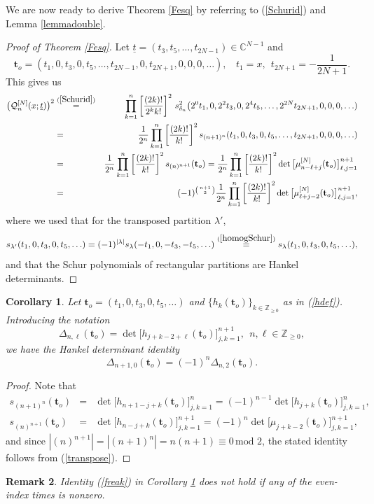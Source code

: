 \documentclass[10pt,reqno,oneside]{amsart}
\numberwithin{equation}{section}
\newtheorem{theo}{Theorem}[section]
\newtheorem{remark}[theo]{Remark}
\newtheorem{corollary}[theo]{Corollary}
\def\le{\left}
\def\ri{\right}
\def\un{\underline}
\def\bt{\begin{theo}}
\def\bc{\begin{corollary}}
\def\ec{\end{corollary}}
\def\br{\begin{remark}}
\def\er{\end{remark}}
\def\mod{\, \mathrm{mod}\,\,}
\def\eqref#1{(\ref{#1})}
\def\bt{{\mathbf t}}
\def\binom#1#2{\le({#1 \atop #2}\ri)}
\begin{document}
%
%
%
We are now ready to derive Theorem \ref{Fesq} by referring to \eqref{Schurid} and Lemma \ref{lemmadouble}.
\begin{proof}[Proof of Theorem \ref{Fesq}] Let $\un t=(t_3,t_5,\ldots,t_{2N-1})\in\mathbb{C}^{N-1}$ and
\begin{equation*}
	\bt_o=(t_1,0,t_3,0,t_5,\ldots,t_{2N-1},0,t_{2N+1},0,0,0,\ldots),\ \ \ \ t_1=x,\ \ t_{2N+1}=-\frac{1}{2N+1}.
\end{equation*}
This gives us
\begin{eqnarray*}
	\big(\mathcal{Q}_n^{[N]}(x;\un t)\big)^2&\stackrel{\eqref{Schurid}}{=}&\prod_{k=1}^n\left[\frac{(2k)!}{2^kk!}\right]^2\,s_{\delta_n}^2\big(2^0t_1,0,2^2t_3,0,2^4t_5,\ldots,2^{2N}t_{2N+1},0,0,0,\ldots)\\
	&=&\frac{1}{2^n}\prod_{k=1}^n\left[\frac{(2k)!}{k!}\right]^2s_{(n+1)^n}(t_1,0,t_3,0,t_5,\ldots,t_{2N+1},0,0,0,\ldots)\\
	&=&\frac{1}{2^n}\prod_{k=1}^n\left[\frac{(2k)!}{k!}\right]^2s_{(n)^{n+1}}(\bt_o)=\frac{1}{2^n}\prod_{k=1}^n\left[\frac{(2k)!}{k!}\right]^2\det\big[\mu_{n-\ell+j}^{[N]}(\bt_o)\big]_{\ell,j=1}^{n+1}\\
	&=&(-1)^{\binom{n+1}{2}}\frac{1}{2^n}\prod_{k=1}^n\left[\frac{(2k)!}{k!}\right]^2\det\big[\mu_{\ell+j-2}^{[N]}(\bt_o)\big]_{\ell,j=1}^{n+1},
\end{eqnarray*}
where we used that for the transposed partition $\lambda'$,
\begin{equation}\label{transpose}
	s_{\lambda'}(t_1,0,t_3,0,t_5,\ldots)=(-1)^{|\lambda|}s_{\lambda}(-t_1,0,-t_3,-t_5,\ldots)\stackrel{\eqref{homogSchur}}{=}s_{\lambda}(t_1,0,t_3,0,t_5,\ldots),
\end{equation}
and that the Schur polynomials of rectangular partitions are Hankel determinants.
\end{proof}
%
%
%

\bc\label{corfreak} Let $\bt_{o}=(t_1,0,t_3,0,t_5,\ldots)$ and $\{h_k(\bt_{o})\}_{k\in\mathbb{Z}_{\geq 0}}$ as in \eqref{hdef}. Introducing the notation
\begin{equation*}
	\Delta_{n,\ell}(\bt_{o}) = \det\big[h_{j+k-2+\ell}(\bt_{o})\big]_{j,k=1}^{n+1},\ \ n,\ell\in\mathbb{Z}_{\geq 0},
\end{equation*}
we have the Hankel determinant identity
\begin{equation}\label{freak}
	\Delta_{n+1,0}(\bt_{o})=(-1)^n\Delta_{n,2}(\bt_{o}).
\end{equation}
\ec
\begin{proof} Note that
\begin{eqnarray*}
	s_{(n+1)^n}(\bt_{o})&=&\det\big[h_{n+1-j+k}(\bt_{o})\big]_{j,k=1}^n=(-1)^{n-1}\det\big[h_{j+k}(\bt_{o})\big]_{j,k=1}^n,\\
	s_{(n)^{n+1}}(\bt_{o})&=&\det\big[h_{n-j+k}(\bt_{o})\big]_{j,k=1}^{n+1}=(-1)^n\det\big[\mu_{j+k-2}(\bt_{o})\big]_{j,k=1}^{n+1},
\end{eqnarray*}
and since $|(n)^{n+1}|=|(n+1)^n|=n(n+1)\equiv 0\mod 2$, the stated identity follows from \eqref{transpose}.
\end{proof}
%
\br
Identity \eqref{freak} in Corollary \ref{corfreak} {\em does not hold} if any of the even-index times is nonzero. 
\er
\end{document}
